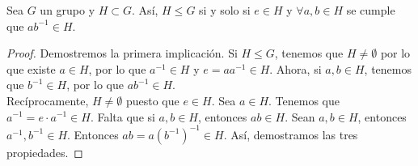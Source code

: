 \begin{prop}
Sea $\displaystyle G $ un grupo y $\displaystyle H \subset G $. Así, $\displaystyle H \leq G $ si y solo si $\displaystyle e \in H $ y $\displaystyle \forall a,b \in H $ se cumple que $\displaystyle ab^{-1} \in H $.
\end{prop}
\begin{proof}
Demostremos la primera implicación. Si $\displaystyle H \leq G $, tenemos que $\displaystyle H \neq \emptyset $ por lo que existe $\displaystyle a \in H $, por lo que $\displaystyle a ^{-1} \in H $ y $\displaystyle e = a a^{-1} \in H $. Ahora, si $\displaystyle a,b \in H $, tenemos que $\displaystyle b^{-1} \in H $, por lo que $\displaystyle a b^{-1} \in H $. \\
Recíprocamente, $\displaystyle H \neq \emptyset $ puesto que $\displaystyle e \in H $. Sea $\displaystyle a \in H $. Tenemos que $\displaystyle a^{-1} = e \cdot a^{-1} \in H $. Falta que si $\displaystyle a,b \in H$, entonces $\displaystyle ab \in H $. Sean $\displaystyle a,b \in H $, entonces $\displaystyle a^{-1}, b^{-1} \in H $. Entonces $\displaystyle ab = a\left(b^{-1}\right)^{-1} \in H $. Así, demostramos las tres propiedades. 
\end{proof}
